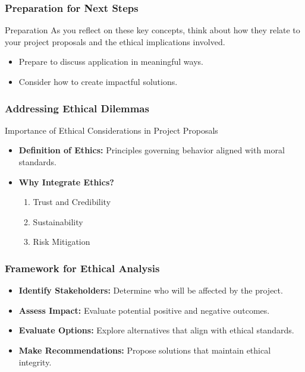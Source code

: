 \documentclass[aspectratio=169]{beamer}
\begin{document}
\begin{frame}[fragile]
    \frametitle{Preparation for Next Steps}
    \begin{block}{Preparation}
        As you reflect on these key concepts, think about how they relate to your project proposals and the ethical implications involved.
    \end{block}
    \begin{itemize}
        \item Prepare to discuss application in meaningful ways.
        \item Consider how to create impactful solutions.
    \end{itemize}
\end{frame}

\begin{frame}[fragile]
    \frametitle{Addressing Ethical Dilemmas}
    \begin{block}{Importance of Ethical Considerations in Project Proposals}
        \begin{itemize}
            \item \textbf{Definition of Ethics:} Principles governing behavior aligned with moral standards.
            \item \textbf{Why Integrate Ethics?}
            \begin{enumerate}
                \item Trust and Credibility
                \item Sustainability
                \item Risk Mitigation
            \end{enumerate}
        \end{itemize}
    \end{block}
\end{frame}

\begin{frame}[fragile]
    \frametitle{Framework for Ethical Analysis}
    \begin{itemize}
        \item \textbf{Identify Stakeholders:} Determine who will be affected by the project.
        \item \textbf{Assess Impact:} Evaluate potential positive and negative outcomes.
        \item \textbf{Evaluate Options:} Explore alternatives that align with ethical standards.
        \item \textbf{Make Recommendations:} Propose solutions that maintain ethical integrity.
    \end{itemize}
\end{frame}
\end{document}
